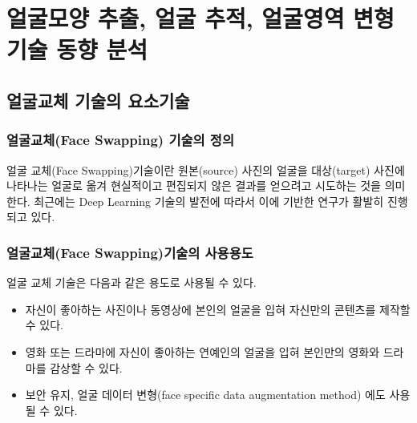 \documentclass[chapter,oneside]{oblivoir}
\begin{document}












\tableofcontents
\newpage

\listoftables
\newpage

\chapter{얼굴모양 추출, 얼굴 추적, 얼굴영역 변형 기술 동향 분석 }

\section{얼굴교체 기술의 요소기술}

\subsection{ 얼굴교체(Face Swapping) 기술의 정의}

얼굴 교체(Face Swapping)기술이란 원본(source) 사진의 얼굴을 대상(target) 사진에 나타나는 얼굴로 옮겨 현실적이고 편집되지 않은 결과를 얻으려고 시도하는 것을 의미한다. 최근에는 Deep Learning 기술의 발전에 따라서 이에 기반한 연구가 활발히 진행되고 있다.

\subsection{ 얼굴교체(Face Swapping)기술의 사용용도}

얼굴 교체 기술은 다음과 같은 용도로 사용될 수 있다.

\begin{itemize}
    \item 자신이 좋아하는 사진이나 동영상에 본인의 얼굴을 입혀 자신만의 콘텐츠를 제작할 수 있다.
    \item 영화 또는 드라마에 자신이 좋아하는 연예인의 얼굴을 입혀 본인만의 영화와 드라마를 감상할 수 있다.
    \item 보안 유지, 얼굴 데이터 변형(face specific data augmentation method) 에도 사용될 수 있다.
\end{itemize}
\end{document}
